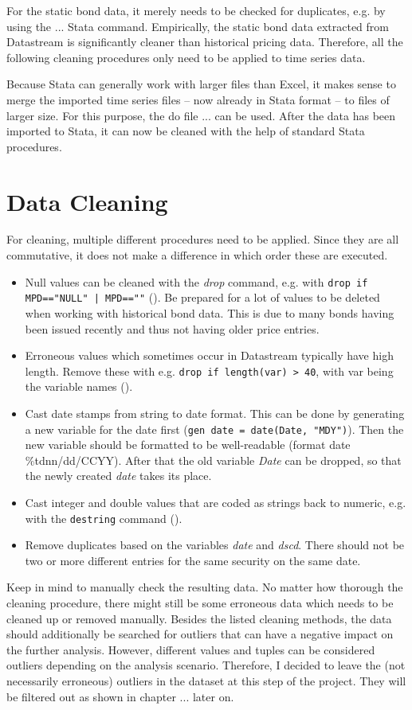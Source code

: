 For the static bond data, it merely needs to be checked for duplicates, e.g. by using the ... Stata command. %
Empirically, the static bond data extracted from Datastream is significantly cleaner than historical pricing data. 
Therefore, all the following cleaning procedures only need to be applied to time series data.

Because Stata can generally work with larger files than Excel, it makes sense to merge the imported time series files -- now already in Stata format -- to files of larger size. For this purpose, the do file ... can be used. %
After the data has been imported to Stata, it can now be cleaned with the help of standard Stata procedures.  

\section{Data Cleaning}
For cleaning, multiple different procedures need to be applied. Since they are all commutative, it does not make a difference in which order these are executed. 
\begin{itemize}
	\item Null values can be cleaned with the \textit{drop} command, e.g. with \lstinline{drop if MPD=="NULL" | MPD==""} (). %
	Be prepared for a lot of values to be deleted when working with historical bond data. This is due to many bonds having been issued recently and thus not having older price entries. 
	\item Erroneous values which sometimes occur in Datastream typically have high length. Remove these with e.g. \lstinline{drop if length(var) > 40}, with var being the variable names (). %
	\item Cast date stamps from string to date format. This can be done by generating a new variable for the date first (\lstinline{gen date = date(Date, "MDY")}). Then the new variable should be formatted to be well-readable (format date \%tdnn/dd/CCYY). After that the old variable \textit{Date} can be dropped, so that the newly created \textit{date} takes its place. 
	\item Cast integer and double values that are coded as strings back to numeric, e.g. with the \lstinline{destring} command (). %
	\item Remove duplicates based on the variables \textit{date} and \textit{dscd}. There should not be two or more different entries for the same security on the same date. %
\end{itemize}
Keep in mind to manually check the resulting data. No matter how thorough the cleaning procedure, there might still be some erroneous data which needs to be cleaned up or removed manually. Besides the listed cleaning methods, the data should additionally be searched for outliers that can have a negative impact on the further analysis. However, different values and tuples can be considered outliers depending on the analysis scenario. Therefore, I decided to leave the (not necessarily erroneous) outliers in the dataset at this step of the project. They will be filtered out as shown in chapter ... later on. %

